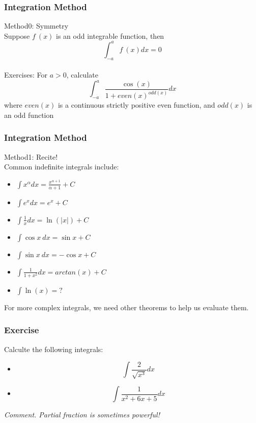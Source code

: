 \documentclass{beamer}
\newcommand{\myfont}{\rmfamily\normalsize\upshape\mdseries}
\begin{document}
\begin{frame}
    \frametitle{Integration Method}
    Method0: Symmetry\\
    \vspace{1em}\hspace{1em}
    Suppose $f~(x)$ is an odd integrable function, then $$\int_{-a}^a f~(x)dx=0$$
    \\
    \vspace{1em}
    \hspace{1em} Exercises: For $a>0$, calculate
    $$\int_{-a}^a \frac{\cos(x)}{1+even(x)^{odd(x)}} dx$$
    where $even(x)$ is a continuous strictly positive even function, and $odd(x)$ is an odd function
\end{frame}
\begin{frame}
    \frametitle{Integration Method}
    Method1: Recite!\\
    \vspace{1em}
    Common indefinite integrals include:
    \begin{itemize}
        \item $\int x^\alpha dx=\frac{x^{\alpha+1}}{\alpha+1} +C$
        \item $\int e^x dx=e^x +C $
        \item $\int \frac{1}{x}dx=\ln(|x|)+C$
        \item $\int \cos x~ dx = \sin x +C$
        \item $\int \sin x~ dx = -\cos x +C$
        \item $\int \frac{1}{1+x^2} dx = arctan(x) +C$
        \item $\int \ln(x)= ?$
    \end{itemize}
    For more complex integrals, we need other theorems to help us evaluate
    them.
\end{frame}
\begin{frame}
    \frametitle{Exercise}
    Calculte the following integrals:
    \begin{itemize}
        \item $$\int \frac{2}{\sqrt{x^3}} dx$$
        \item $$\int \frac{1}{x^2+6x+5} dx$$
    \end{itemize}
    \vspace{1em}
    \hspace{1em}
    \itshape
    Comment. Partial fraction is sometimes powerful!\myfont
\end{frame}
\end{document}
